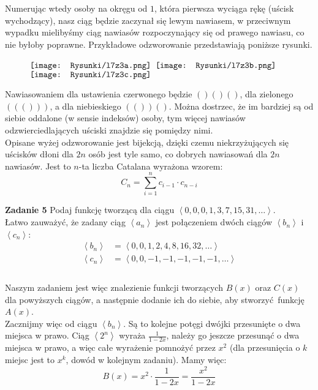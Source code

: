\documentclass[a4paper,12pt]{article}
\newcommand{\sequence}[1]{\left\langle #1 \right\rangle} %
\begin{document}
\noindent Numerując wtedy osoby na okręgu od $1$, która pierwsza wyciąga rękę (uścisk wychodzący), nasz ciąg będzie zaczynał się lewym nawiasem, w przeciwnym wypadku mielibyśmy ciąg nawiasów rozpoczynający się od prawego nawiasu, co nie byłoby poprawne. Przykładowe odzworowanie przedstawiają poniższe rysunki.

\begin{figure}[H] %
	\centering
	$\vcenter{\hbox{\texttt{[image: Rysunki/l7z3a.png]}}}$
	$\vcenter{\hbox{\texttt{[image: Rysunki/l7z3b.png]}}}$
	$\vcenter{\hbox{\texttt{[image: Rysunki/l7z3c.png]}}}$
\end{figure}

\noindent Nawiasowaniem dla ustawienia czerwonego będzie $()()()$, dla zielonego $((()))$, a dla niebieskiego $(())()$. Można dostrzec, że im bardziej są od siebie oddalone (w sensie indeksów) osoby, tym więcej nawiasów odzwierciedlających uściski znajdzie się pomiędzy nimi.\\

\noindent Opisane wyżej odzworowanie jest bijekcją, dzięki czemu niekrzyżujących się uścisków dłoni dla $2n$ osób jest tyle samo, co dobrych nawiasowań dla $2n$ nawiasów. Jest to $n$-ta liczba Catalana wyrażona wzorem:
\[ C_n = \sum\limits_{i = 1}^{n} c_{i - 1} \cdot c_{n - i} \] 

\newpage
\noindent \textbf{Zadanie 5} \newline
Podaj funkcję tworzącą dla ciągu $\sequence{0, 0, 0, 1, 3, 7, 15, 31, \ldots}$.\\

\noindent Łatwo zauważyć, że zadany ciąg $\sequence{a_n}$ jest połączeniem dwóch ciągów $\sequence{b_n}$ i $\sequence{c_n}$:
\begin{align*}
    \sequence{b_n}  &= \sequence{0, 0, 1, 2, 4, 8, 16, 32, \ldots} \\
    \sequence{c_n}  &= \sequence{0, 0, -1, -1, -1, -1, -1, \ldots} \\
\end{align*} \\[-50pt]

\noindent Naszym zadaniem jest więc znalezienie funkcji tworzących $B(x)$ oraz $C(x)$ dla powyższych ciągów, a następnie dodanie ich do siebie, aby stworzyć funkcję $A(x)$. \\

\noindent Zacznijmy więc od ciągu $\sequence{b_n}$. Są to kolejne potęgi dwójki przesunięte o dwa miejsca w prawo. Ciąg $\sequence{2^n}$ wyraża $\frac{1}{1-2x}$, należy go jeszcze przesunąć o dwa miejsca w prawo, a więc całe wyrażenie pomnożyć przez $x^2$ (dla przesunięcia o $k$ miejsc jest to $x^k$, dowód w kolejnym zadaniu). Mamy więc:
\[ B(x) = x^2 \cdot \frac{1}{1 - 2x} = \frac{x^2}{1 - 2x} \]
 
\end{document}
